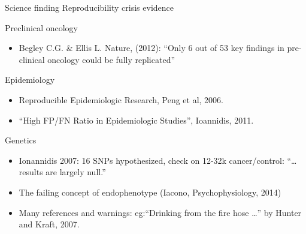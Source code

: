 \documentclass[ignorenonframetext,]{beamer}
\begin{document}
\begin{frame}{Science finding Reproducibility crisis evidence}

\begin{block}{Preclinical oncology}

\begin{itemize}[<+->]
\itemsep1pt\parskip0pt
\item
  Begley C.G. \& Ellis L. Nature, (2012): ``Only 6 out of 53 key
  findings in pre-clinical oncology could be fully replicated''
\end{itemize}

\end{block}

\begin{block}{Epidemiology}

\begin{itemize}[<+->]
\itemsep1pt\parskip0pt
\item
  Reproducible Epidemiologic Research, Peng et al, 2006.
\item
  ``High FP/FN Ratio in Epidemiologic Studies'', Ioannidis, 2011.
\end{itemize}

\end{block}

\begin{block}{Genetics}

\begin{itemize}[<+->]
\itemsep1pt\parskip0pt
\item
  Ionannidis 2007: 16 SNPs hypothesized, check on 12-32k cancer/control:
  ``\ldots{} results are largely null.''
\item
  The failing concept of endophenotype (Iacono, Psychophysiology, 2014)
\item
  Many references and warnings: eg:``Drinking from the fire hose
  \ldots{}'' by Hunter and Kraft, 2007.
\end{itemize}

\end{block}

\end{frame}
\end{document}
